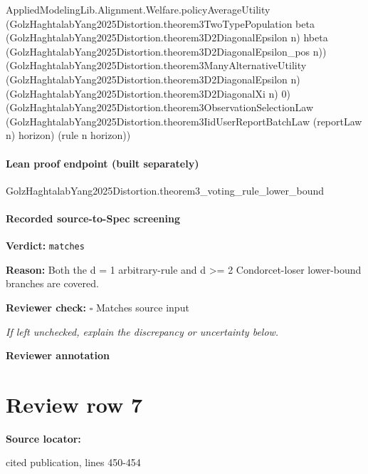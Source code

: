 \documentclass[10pt]{article}
\newcommand{\reviewerbox}{%
  \par\noindent\fbox{\parbox{0.96\linewidth}{\rule{0pt}{0.38in}}}\par
}
\newcommand{\reviewmatch}[1]{%
  \par\noindent\textbf{Reviewer check:} $\square$\; #1\par
  \noindent\emph{If left unchecked, explain the discrepancy or uncertainty below.}\par
}
\begin{document}
\begin{ReviewVerbatim}
                                AppliedModelingLib.Alignment.Welfare.policyAverageUtility
                                  (GolzHaghtalabYang2025Distortion.theorem3TwoTypePopulation beta
                                    (GolzHaghtalabYang2025Distortion.theorem3D2DiagonalEpsilon n) hbeta
                                    (GolzHaghtalabYang2025Distortion.theorem3D2DiagonalEpsilon_pos n))
                                  (GolzHaghtalabYang2025Distortion.theorem3ManyAlternativeUtility
                                    (GolzHaghtalabYang2025Distortion.theorem3D2DiagonalEpsilon n)
                                    (GolzHaghtalabYang2025Distortion.theorem3D2DiagonalXi n) 0)
                                  (GolzHaghtalabYang2025Distortion.theorem3ObservationSelectionLaw
                                    (GolzHaghtalabYang2025Distortion.theorem3IidUserReportBatchLaw (reportLaw n)
                                      horizon)
                                    (rule n horizon))
\end{ReviewVerbatim}

\paragraph{Lean proof endpoint (built separately)}\begin{ReviewVerbatim}
GolzHaghtalabYang2025Distortion.theorem3_voting_rule_lower_bound
\end{ReviewVerbatim}

\paragraph{Recorded source-to-Spec screening}
\textbf{Verdict:} \texttt{matches}
\\
{\raggedright
\textbf{Reason:} Both the d = 1 arbitrary-\allowbreak{}rule and d >= 2 Condorcet-\allowbreak{}loser lower-\allowbreak{}bound branches are covered.\allowbreak{}
\par}
\reviewmatch{Matches source input}
\noindent\textbf{Reviewer annotation}\par
\reviewerbox
\clearpage
\hypertarget{source-claim-27fd47f63d6ea396}{}
\section*{Review row 7}
\textbf{Source locator:} {\footnotesize\raggedright cited publication, lines 450-\allowbreak{}454\par}
\end{document}
